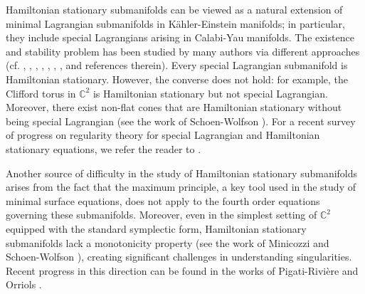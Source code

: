 \documentclass[12pt,reqno]{amsart}%
\theoremstyle{plain}
\numberwithin{equation}{section}
\theoremstyle{definition}
\theoremstyle{remark}
\begin{document}
Hamiltonian stationary submanifolds can be viewed as a natural extension of minimal Lagrangian submanifolds in Kähler-Einstein manifolds; in particular, they include special Lagrangians arising in Calabi-Yau manifolds. The existence and stability problem has been studied by
many authors via different approaches (cf. \cite{MR1062973}, \cite{MR1611051},
\cite{SWJDG}, \cite{HeleinRomon2002}, \cite{MR1986315}, \cite{HeleinRomon2005}, \cite{JLS}, and references therein). Every special Lagrangian submanifold is Hamiltonian stationary. However, the converse does not hold: for example, the Clifford torus in $\mathbb{C}^2$ is Hamiltonian stationary but not special Lagrangian. Moreover, there exist non-flat cones that are Hamiltonian stationary without being special Lagrangian (see the work of Schoen-Wolfson \cite{SW03}). For a recent survey of progress on regularity theory for special Lagrangian and Hamiltonian stationary equations, we refer the reader to \cite{chen2022regularity}.

Another source of difficulty in the study of Hamiltonian stationary submanifolds arises from the fact that the maximum principle, a key tool used in the study of minimal surface equations, does not apply to the fourth order equations governing these submanifolds. Moreover, even in the simplest setting of $\mathbb{C}^2$ equipped with the standard symplectic form, Hamiltonian stationary submanifolds lack a monotonicity property (see the work of Minicozzi \cite{minicozzi1995willmore} and Schoen-Wolfson \cite{SWJDG}), creating significant challenges in understanding singularities. Recent progress in this direction can be found in the works of Pigati-Rivi\`ere \cite{pigati2024variational} and Orriols \cite{orriols2024existence}. 
\end{document}
